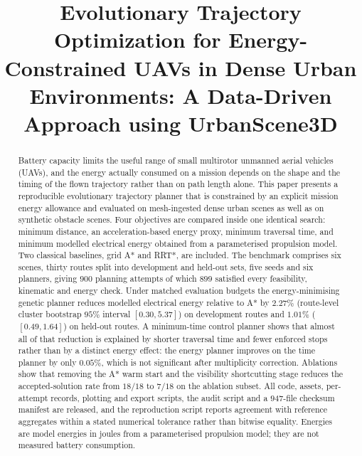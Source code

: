 \documentclass[conference]{IEEEtran}
\begin{document}
\title{Evolutionary Trajectory Optimization for Energy-Constrained UAVs in Dense Urban Environments: A Data-Driven Approach using UrbanScene3D}

\author{
\and
{}
}

\maketitle

\begin{abstract}
Battery capacity limits the useful range of small multirotor unmanned aerial
vehicles (UAVs), and the energy actually consumed on a mission depends on the
shape and the timing of the flown trajectory rather than on path length alone.
This paper presents a reproducible evolutionary trajectory planner that is
constrained by an explicit mission energy allowance and evaluated on
mesh-ingested dense urban scenes as well as on synthetic obstacle scenes. Four
objectives are compared inside one identical search: minimum distance, an
acceleration-based energy proxy, minimum traversal time, and minimum modelled
electrical energy obtained from a parameterised propulsion model. Two classical
baselines, grid A* and RRT*, are included. The benchmark comprises six scenes,
thirty routes split into development and held-out sets, five seeds and six
planners, giving $900$ planning attempts of which $899$ satisfied every
feasibility, kinematic and energy check. Under matched evaluation budgets the
energy-minimising genetic planner reduces modelled electrical energy relative to
A* by $2.27\%$ (route-level cluster bootstrap $95\%$ interval $[0.30, 5.37]$) on
development routes and $1.01\%$ ($[0.49, 1.64]$) on held-out routes. A
minimum-time control planner shows that almost all of that reduction is
explained by shorter traversal time and fewer enforced stops rather than by a
distinct energy effect: the energy planner improves on the time planner by only
$0.05\%$, which is not significant after multiplicity correction. Ablations show
that removing the A* warm start and the visibility shortcutting stage reduces the
accepted-solution rate from $18/18$ to $7/18$ on the ablation subset. All code,
assets, per-attempt records, plotting and export scripts, the audit script and a
$947$-file checksum manifest are released, and the reproduction script reports
agreement with reference aggregates within a stated numerical tolerance rather
than bitwise equality. Energies are model energies in joules from a
parameterised propulsion model; they are not measured battery consumption.
\end{abstract}
\end{document}
